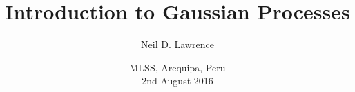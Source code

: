 
\usenavigationsymbolstemplate{}

\setlength{\parskip}{1em}


\usepackage{natbib}

\usepackage{amsmath}
\usepackage{amssymb}

\usepackage{bm}
\usepackage{pxfonts}
\usepackage{palatino}

\usepackage{listings}

\usepackage{multimedia}
\usepackage{xmpmulti}
\usepackage{graphicx}
\usepackage{subfigure}
\usepackage{tikz}
\usepackage{media9}
\usepackage{animate}
\usepackage{pgf}

\usepackage{relsize}
\usepackage{setspace}
\usepackage{multirow}
\usepackage{textpos}









\newcommand{\inputVals}{\inputVector}
\newcommand{\rbfKernel}{EQ}
\newcommand{\rbfKernelLong}{exponentiated quadratic}



\title[Gaussian Processes]{Introduction to Gaussian Processes}

\author[Lawrence]{Neil D. Lawrence}

\date[MLSS 2016]{MLSS, Arequipa, Peru\\
2nd August 2016}

